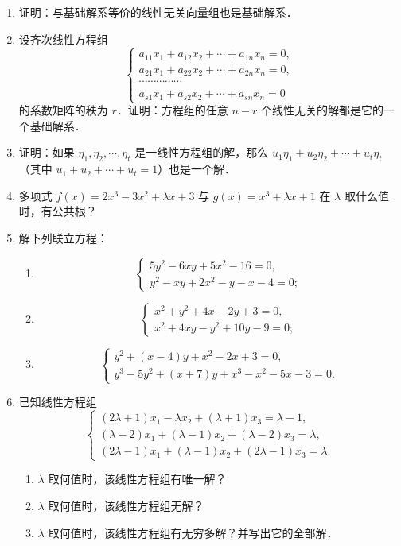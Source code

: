 \begin{enumerate}
  \ansproof
  \item 证明：与基础解系等价的线性无关向量组也是基础解系．
  \ansproof
  \item 设齐次线性方程组
  \[
    \begin{cases}
      a_{11}x_1+a_{12}x_2+\cdots+a_{1n}x_n=0,\\
      a_{21}x_1+a_{22}x_2+\cdots+a_{2n}x_n=0,\\
      \cdots\cdots\cdots\cdots\cdots\\
      a_{s1}x_1+a_{s2}x_2+\cdots+a_{sn}x_n=0
    \end{cases}
  \]
  的系数矩阵的秩为 $r$．证明：方程组的任意 $n-r$ 个线性无关的解都是它的一个基础解系．
  \ansproof
  \item 证明：如果 $\eta_1,\eta_2,\cdots,\eta_t$ 是一线性方程组的解，那么 $u_1\eta_1+u_2\eta_2+\cdots+u_t\eta_t$（其中 $u_1+u_2+\cdots+u_t=1$）也是一个解．
  \ansproof
  \item 多项式 $f(x)=2x^3-3x^2+\lambda x+3$ 与 $g(x)=x^3+\lambda x+1$ 在 $\lambda$ 取什么值时，有公共根？
  \ansgeneral
  \item 解下列联立方程：
  \begin{enumerate}
    \item \[
      \begin{cases}
        5y^2-6xy+5x^2-16=0,\\
        y^2-xy+2x^2-y-x-4=0;
      \end{cases}
    \]
  \anssub
    \item \[
      \begin{cases}
        x^2+y^2+4x-2y+3=0,\\
        x^2+4xy-y^2+10y-9=0;
      \end{cases}
    \]
  \anssub
    \item \[
      \begin{cases}
        y^2+(x-4)y+x^2-2x+3=0,\\
        y^3-5y^2+(x+7)y+x^3-x^2-5x-3=0.
      \end{cases}
    \]
  \anssub
  \end{enumerate}
  \item 已知线性方程组
  \[
    \begin{cases}
      (2\lambda+1)x_1-\lambda x_2+(\lambda+1)x_3=\lambda-1,\\
      (\lambda-2)x_1+(\lambda-1)x_2+(\lambda-2)x_3=\lambda,\\
      (2\lambda-1)x_1+(\lambda-1)x_2+(2\lambda-1)x_3=\lambda.
    \end{cases}
  \]
  \begin{enumerate}
    \item $\lambda$ 取何值时，该线性方程组有唯一解？
  \anssub
    \item $\lambda$ 取何值时，该线性方程组无解？
  \anssub
    \item $\lambda$ 取何值时，该线性方程组有无穷多解？并写出它的全部解．
  \anssub
  \end{enumerate}
\end{enumerate}


